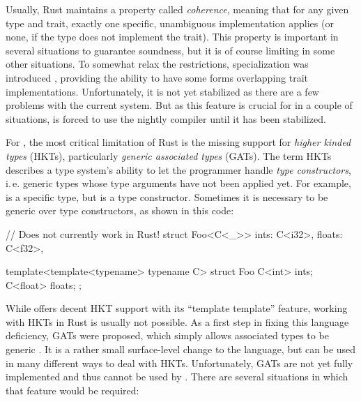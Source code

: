 Usually, Rust maintains a property called \emph{coherence}, meaning that for any given type and trait, exactly one specific, unambiguous implementation applies (or none, if the type does not implement the trait).
This property is important in several situations to guarantee soundness, but it is of course limiting in some other situations.
To somewhat relax the restrictions, specialization was introduced \cite{rfc1210}, providing the ability to have some forms overlapping trait implementations.
Unfortunately, it is not yet stabilized as there are a few problems with the current system.
But as this feature is crucial for  in a couple of situations,  is forced to use the nightly compiler until it has been stabilized.

\vfill

For , the most critical limitation of Rust is the missing support for \emph{higher kinded types} (HKTs), particularly \emph{generic associated types} (GATs).
The term HKTs describes a type system's ability to let the programmer handle \emph{type constructors}, i.\,e. generic types whose type arguments have not been applied yet.
For example,  is a specific type, but  is a type constructor.
Sometimes it is necessary to be generic over type constructors, as shown in this code:

\vspace{5mm}
\begin{minipage}{0.47\textwidth}
  \begin{rustcode}
    // Does not currently work in Rust!
    struct Foo<C<_>> {
        ints: C<i32>,
        floats: C<f32>,
    }
  \end{rustcode}
\end{minipage}
\begin{minipage}{0.51\textwidth}
  \begin{cppcode}
    template<template<typename> typename C>
    struct Foo {
        C<int> ints;
        C<float> floats;
    };
  \end{cppcode}
\end{minipage}

\newpage
While \cpp offers decent HKT support with its \enquote{template template} feature, working with HKTs in Rust is usually not possible.
As a first step in fixing this language deficiency, GATs were proposed, which simply allows associated types to be generic \cite{rfc1598}.
It is a rather small surface-level change to the language, but can be used in many different ways to deal with HKTs.
Unfortunately, GATs are not yet fully implemented and thus cannot be used by .
There are several situations in which that feature would be required:

